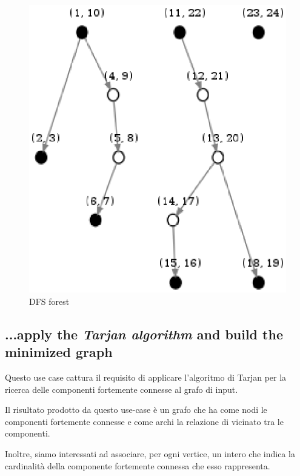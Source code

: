 \begin{figure}
  \centering
  \includegraphics{images/OnePipingLevelUnitTest_Printer_DFS_PrinterPipe_Papadimitriou-phase-PrinterPipeFilter-level-2.eps}
  \caption{DFS forest}
  \label{fig:dfs-forest}
\end{figure}

\subsection{...apply the \emph{Tarjan algorithm} and build the
  minimized graph}
Questo use case cattura il requisito di applicare l'algoritmo di
Tarjan per la ricerca delle componenti fortemente connesse al grafo di
input.

Il risultato prodotto da questo use-case \`e un grafo che ha
come nodi le componenti fortemente connesse e come archi la relazione
di vicinato tra le componenti.

Inoltre, siamo interessati ad associare, per ogni vertice, un intero
che indica la cardinalit\`a della componente fortemente connessa che
esso rappresenta.

